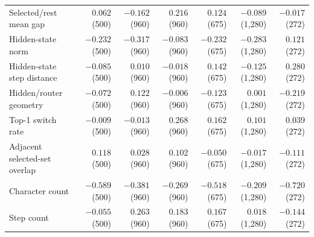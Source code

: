 \begin{longtable}{@{}lrrrrrr@{}}
Selected/rest mean gap & $0.062$ (500) & $-0.162$ (960) & $0.216$ (960) & $0.124$ (675) & $-0.089$ (1,280) & $-0.017$ (272) \\
Hidden-state norm & $-0.232$ (500) & $-0.317$ (960) & $-0.083$ (960) & $-0.232$ (675) & $-0.283$ (1,280) & $0.121$ (272) \\
Hidden-state step distance & $-0.085$ (500) & $0.010$ (960) & $-0.018$ (960) & $0.142$ (675) & $-0.125$ (1,280) & $0.280$ (272) \\
Hidden/router geometry & $-0.072$ (500) & $0.122$ (960) & $-0.006$ (960) & $-0.123$ (675) & $0.001$ (1,280) & $-0.219$ (272) \\
Top-1 switch rate & $-0.009$ (500) & $-0.013$ (960) & $0.268$ (960) & $0.162$ (675) & $0.101$ (1,280) & $0.039$ (272) \\
Adjacent selected-set overlap & $0.118$ (500) & $0.028$ (960) & $0.102$ (960) & $-0.050$ (675) & $-0.017$ (1,280) & $-0.111$ (272) \\
Character count & $-0.589$ (500) & $-0.381$ (960) & $-0.269$ (960) & $-0.518$ (675) & $-0.209$ (1,280) & $-0.720$ (272) \\
Step count & $-0.055$ (500) & $0.263$ (960) & $0.183$ (960) & $0.167$ (675) & $0.018$ (1,280) & $-0.144$ (272) \\
\midrule
\end{longtable}\endgroup
